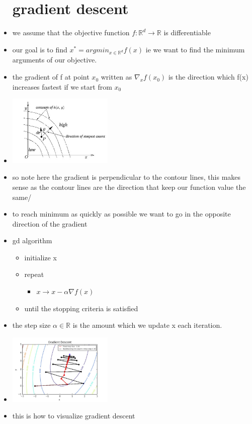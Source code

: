 \documentclass{article}
\begin{document}
\begin{itemize}
\section{gradient descent }
\item we assume that the objective function $f:\mathbb{R}^{d}\rightarrow \mathbb{R}$ is differentiable 
\item our goal is to find $x^{*}=argmin_{x\in \mathbb{R}^{d}}f(x)$ ie we want to find the  minimum arguments  of our objective. 
\item the gradient of f at point $x_0$ written as $\nabla_{x}f(x_0)$ is the direction which f(x) increases fastest if we start from $x_0$
\item \includegraphics[width=5cm]{lecture_notes/lecture_2/immages/g_d_1.jpg}
\item so note here the gradient is perpendicular to the contour lines, this makes sense as the contour lines are the direction that keep our function value the same/
\item  to reach  minimum as quickly as possible we want to go in the opposite direction of the gradient
\item gd algorithm
\begin{itemize}
    \item initialize x
    \item repeat
    \begin{itemize}
        \item $x\rightarrow x-\alpha \nabla f(x)$
    \end{itemize}
    \item until the stopping criteria is satisfied 
\end{itemize}
\item the step size $\alpha\in \mathbb{R}$ is the amount which we update x each iteration. 
\item \includegraphics[width=5cm]{lecture_notes/lecture_2/immages/g_d_2.jpg} 
\item this is how to visualize gradient descent

\end{itemize}
\end{document}

